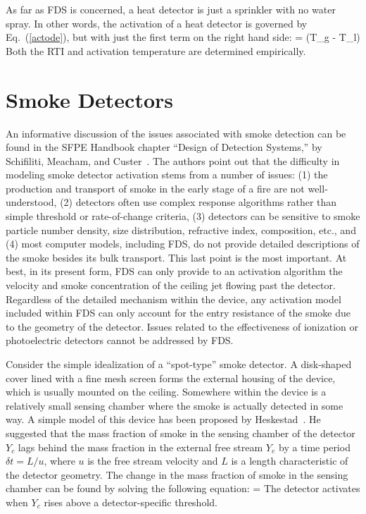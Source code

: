 As far as FDS is concerned, a heat detector is just a sprinkler with no water spray. In other words, the activation of a heat
detector is governed by Eq.~(\ref{actode}), but with just the first term on the right hand side:
\be {} =  (T_g - T_l)  \label{heatactode} \ee
Both the RTI and activation temperature are determined empirically.


\section{Smoke Detectors}

An informative discussion of the issues associated with smoke detection can be found in the
SFPE Handbook chapter ``Design of Detection Systems,'' by Schifiliti, Meacham, and Custer~\cite{SFPE}.
The authors point out that the difficulty in modeling smoke detector activation stems from a number of issues:
(1) the production and transport of smoke in the early stage of a fire are not well-understood, (2) detectors often use
complex response algorithms rather than simple threshold or rate-of-change criteria, (3) detectors can be sensitive
to smoke particle number density, size distribution, refractive index, composition, etc., and (4) most
computer models, including FDS, do not provide detailed descriptions of the smoke besides its bulk transport. This
last point is the most important. At best, in its present form, FDS can only provide to an activation algorithm the
velocity and smoke concentration of the ceiling jet flowing past the detector. Regardless of the
detailed mechanism within
the device, any activation model included within FDS can only account for the entry resistance of the smoke due to the
geometry of the detector. Issues related to the effectiveness of ionization or photoelectric detectors cannot be
addressed by FDS.

Consider the simple idealization of a ``spot-type'' smoke detector. A disk-shaped cover lined with a fine mesh screen
forms the external housing of the device, which is usually mounted on the ceiling.
Somewhere within the device is a relatively small sensing chamber where the smoke is actually detected in some way.
A simple model of this device has been proposed by Heskestad~\cite{SFPE}. He suggested that the mass fraction of smoke in the
sensing chamber of the detector $Y_c$ lags behind the mass fraction in the
external free stream $Y_e$ by a time period $\delta t = L/u$,
where $u$ is the free stream velocity and $L$ is a length characteristic of the detector geometry.
The change in the mass fraction of smoke in the sensing chamber can be found by solving the following equation:
\be {} =  \label{HYoeq} \ee
The detector activates when $Y_c$ rises above a detector-specific threshold.

